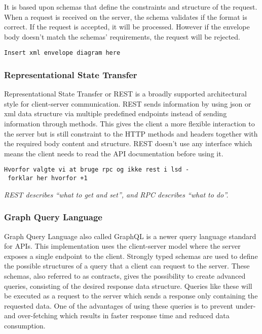 \documentclass[
]{article}
\begin{document}
It is based upon schemas that define the constraints and structure of
the request. When a request is received on the server, the schema
validates if the format is correct. If the request is accepted, it will
be processed. However if the envelope body doesn't match the schemas'
requirements, the request will be rejected.

\texttt{Insert\ xml\ envelope\ diagram\ here}

\hypertarget{representational-state-transfer}{%
\subsubsection{Representational State
Transfer}\label{representational-state-transfer}}

Representational State Transfer or REST is a broadly supported
architectural style for client-server communication. REST sends
information by using json or xml data structure via multiple predefined
endpoints instead of sending information through methods. This gives the
client a more flexible interaction to the server but is still constraint
to the HTTP methods and headers together with the required body content
and structure. REST doesn't use any interface which means the client
needs to read the API documentation before using it.

\texttt{Hvorfor\ valgte\ vi\ at\ bruge\ rpc\ og\ ikke\ rest\ i\ lsd\ -\ forklar\ her\ hvorfor\ +1}

\emph{REST describes ``what to get and set'', and RPC describes ``what
to do''.}

\hypertarget{graph-query-language}{%
\subsubsection{Graph Query Language}\label{graph-query-language}}

Graph Query Language also called GraphQL is a newer query language
standard for APIs. This implementation uses the client-server model
where the server exposes a single endpoint to the client. Strongly typed
schemas are used to define the possible structures of a query that a
client can request to the server. These schemas, also referred to as
contracts, gives the possibility to create advanced queries, consisting
of the desired response data structure. Queries like these will be
executed as a request to the server which sends a response only
containing the requested data. One of the advantages of using these
queries is to prevent under- and over-fetching which results in faster
response time and reduced data consumption.
\end{document}
